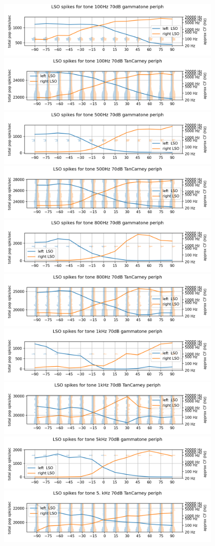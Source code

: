 \documentclass[11pt,a4paper,twocolumn]{article}
\begin{document}
\begin{figure}
    \centering
    \includegraphics[width=0.4\linewidth]{Images/lso100.png}
    \includegraphics[width=0.4\linewidth]{Images/lso100tc.png}
    \includegraphics[width=0.4\linewidth]{Images/lso500.png}
    \includegraphics[width=0.4\linewidth]{Images/lso500tc.png}
    \includegraphics[width=0.4\linewidth]{Images/lso800.png}
    \includegraphics[width=0.4\linewidth]{Images/lso800tc.png}
    \includegraphics[width=0.4\linewidth]{Images/1khz.png}
    \includegraphics[width=0.4\linewidth]{Images/lso1000tc.png}
    \includegraphics[width=0.4\linewidth]{Images/lso5khz.png}
    \includegraphics[width=0.4\linewidth]{Images/lso5000tc.png}

\end{figure}
\end{document}
